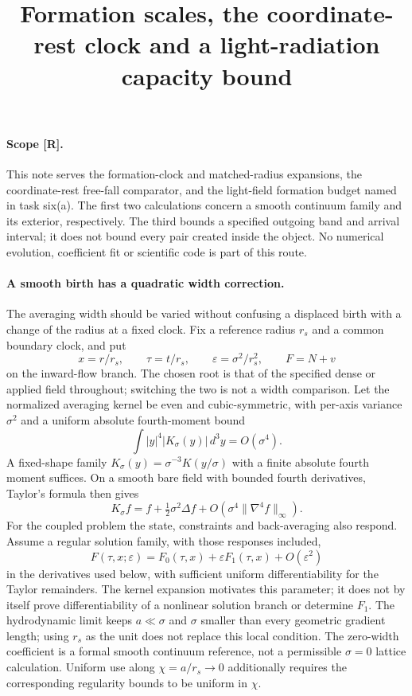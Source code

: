 \documentclass[11pt]{article}
\title{Formation scales, the coordinate-rest clock and a light-radiation capacity bound}
\author{}
\date{}
\begin{document}
\maketitle

\paragraph{Scope [R].}
This note serves the formation-clock and matched-radius expansions, the
coordinate-rest free-fall comparator, and the light-field formation budget
named in task six(a). The first two calculations concern a smooth
continuum family and its exterior, respectively. The third bounds a
specified outgoing band and arrival interval; it does not bound every
pair created inside the object. No numerical evolution, coefficient fit
or scientific code is part of this route.

\paragraph{A smooth birth has a quadratic width correction.}
The averaging width should be varied without confusing a displaced birth
with a change of the radius at a fixed clock. Fix a reference radius
$r_s$ and a common boundary clock, and put
\[
 x=r/r_s,\qquad \tau=t/r_s,\qquad
 \varepsilon=\sigma^2/r_s^2,\qquad F=N+v
\]
on the inward-flow branch. The chosen root is that of the specified
dense or applied field throughout; switching the two is not a width
comparison. Let the normalized averaging kernel be even and
cubic-symmetric, with per-axis variance $\sigma^2$ and a uniform
absolute fourth-moment bound
\[
 \int |y|^4|K_\sigma(y)|\,d^3y=O(\sigma^4).
\]
A fixed-shape family $K_\sigma(y)=\sigma^{-3}K(y/\sigma)$ with a
finite absolute fourth moment suffices. On a smooth bare field with
bounded fourth derivatives, Taylor's formula then gives
\[
 K_\sigma f=f+\tfrac12\sigma^2\Delta f
             +O(\sigma^4\|\nabla^4f\|_\infty).
\]
For the coupled problem the state, constraints and back-averaging also
respond. Assume a regular solution family, with those responses included,
\[
 F(\tau,x;\varepsilon)=F_0(\tau,x)+\varepsilon F_1(\tau,x)
                  +O(\varepsilon^2)
\]
in the derivatives used below, with sufficient uniform differentiability
for the Taylor remainders. The kernel expansion motivates this
parameter; it does not by itself prove differentiability of a nonlinear
solution branch or determine $F_1$. The hydrodynamic limit keeps
$a\ll\sigma$ and $\sigma$ smaller than every geometric gradient length;
using $r_s$ as the unit does not replace this local condition.
The zero-width coefficient is a formal smooth continuum reference,
not a permissible $\sigma=0$ lattice calculation. Uniform use along
$\chi=a/r_s\to0$ additionally requires the corresponding regularity
bounds to be uniform in $\chi$.
\end{document}
